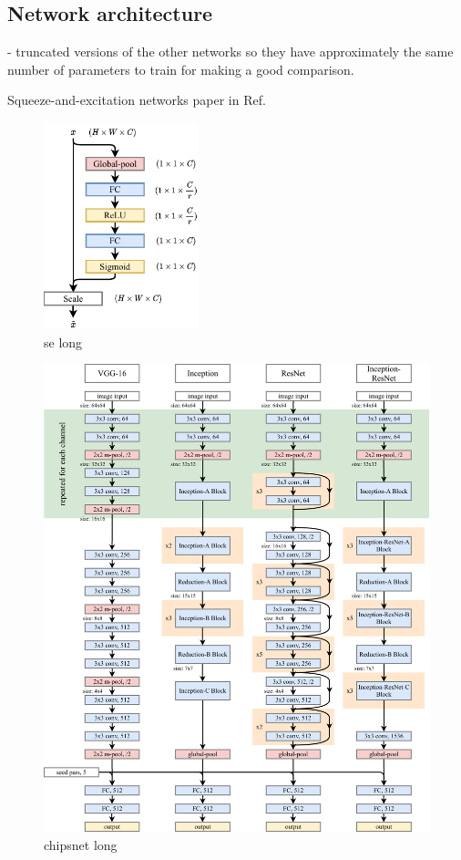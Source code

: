 \subsection{Network architecture} %
\label{sec:cvn_baseline_architecture} %

- truncated versions of the other networks so they have approximately the same number of parameters
to train for making a good comparison.

Squeeze-and-excitation networks paper in Ref.~\cite{hu2018}
\begin{figure} %
    \includegraphics[width=0.4\textwidth]{diagrams/6-cvn/se.pdf}
    \caption[se short]
    {se long}
    \label{fig:se}
\end{figure}

\begin{figure} %
    \includegraphics[width=\textwidth]{diagrams/6-cvn/chipsnet.pdf}
    \caption[chipsnet short]
    {chipsnet long}
    \label{fig:chipsnet}
\end{figure}

